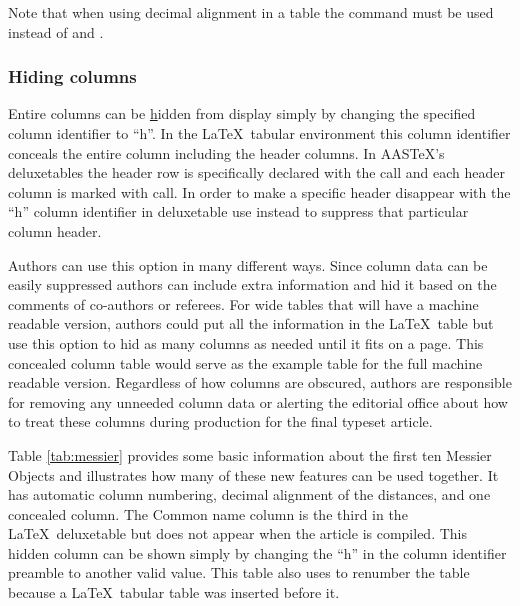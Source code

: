 \documentclass[linenumbers]{aastex631}
\newcommand\aastex{AAS\TeX}
\newcommand\latex{La\TeX}
\begin{document}
Note that when using decimal alignment in a table the command 
{\tt\string\decimalcolnumbers} must be used instead of 
{\tt\string\colnumbers} and {\tt\string\decimals}. 

\subsubsection{Hiding columns} \label{subsubsec:hide}

Entire columns can be \underline{h}idden from display simply by changing
the specified column identifier to ``h''.  In the \latex\ tabular environment
this column identifier conceals the entire column including the header
columns.   In \aastex's deluxetables the header row is specifically
declared with the {\tt\string\tablehead} call and each header column is
marked with {\tt\string\colhead} call.  In order to make a specific header
disappear with the ``h'' column identifier in deluxetable use 
{\tt\string\nocolhead} instead to suppress that particular column header.

Authors can use this option in many different ways.  Since column data can
be easily suppressed authors can include extra information and hid it
based on the comments of co-authors or referees.  For wide tables that will
have a machine readable version, authors could put all the information in
the \latex\ table but use this option to hid as many columns as needed until
it fits on a page. This concealed column table would serve as the
example table for the full machine readable version.  Regardless of how
columns are obscured, authors are responsible for removing any unneeded
column data or alerting the editorial office about how to treat these
columns during production for the final typeset article.

Table \ref{tab:messier} provides some basic information about the first ten
Messier Objects and illustrates how many of these new features can be used
together.  It has automatic column numbering, decimal alignment of the
distances, and one concealed column.  The Common name column
is the third in the \latex\ deluxetable but does not appear when the article
is compiled. This hidden column can be shown simply by changing the ``h'' in
the column identifier preamble to another valid value.  This table also
uses {\tt\string\tablenum} to renumber the table because a \latex\ tabular
table was inserted before it.
\end{document}
